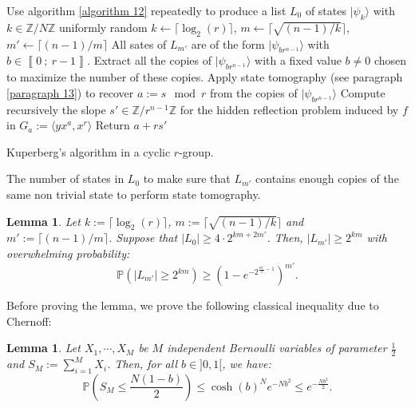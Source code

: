 \documentclass[a4paper,10pt]{report}
\theoremstyle{definition}
\theoremstyle{plain}
\newtheorem{Lemma}[Definition]{Lemma}
\theoremstyle{definition}
\newcommand{\Z}{\mathbb{Z}}
\renewcommand{\i}[2]{\left\llbracket #1~;~#2\right\rrbracket}
\renewcommand{\(}{\left(}
\renewcommand{\)}{\right)}
\renewcommand{\P}{\mathbb{P}}
\begin{document}
\begin{algorithm}\label{algorithm 14}
\SetAlgoLined
{}
\KwResult{$s\in\Z/N\Z$.}

Use algorithm \ref{algorithm 12} repeatedly to produce a list $L_0$ of states $|\psi_k\rangle$ with $k\in\Z/N\Z$ uniformly random\;
$k\leftarrow \lceil\log_2(r)\rceil$, $m\leftarrow \lceil \sqrt{(n-1)/k}\rceil$, $m'\leftarrow\lceil (n-1)/m\rceil$\;
All sates of $L_{m'}$ are of the form $|\psi_{br^{n-1}}\rangle$ with $b\in\i{0}{r-1}$. Extract all the copies of $|\psi_{br^{n-1}}\rangle$ with a fixed value $b\neq 0$ chosen to maximize the number of these copies. \;
Apply state tomography (see paragraph \ref{paragraph 13}) to recover $a:=s \mod r$ from the copies of $|\psi_{br^{n-1}}\rangle$\;
Compute recursively the slope $s'\in\Z/r^{n-1}\Z$ for the hidden reflection problem induced by $f$ in $G_a:=\langle yx^a,x^r\rangle$\;
Return $a+rs'$\;

\caption{Kuperberg's algorithm in a cyclic $r$-group.}
\end{algorithm}

The number of states in $L_0$ to make sure that $L_{m'}$ contains enough copies of the same non trivial state to perform state tomography.

\begin{Lemma}\label{Lemma 21}
Let $k:=\lceil\log_2(r)\rceil$, $m:=\lceil \sqrt{(n-1)/k}\rceil$ and $m':=\lceil (n-1)/m\rceil$. Suppose that $|L_0|\geq 4\cdot 2^{km+2m'}$. Then, $|L_{m'}|\geq 2^{km}$ with overwhelming probability: 
\[\P\(|L_{m'}|\geq 2^{km}\)\geq \(1-e^{-2^{\frac{m'}{3}-1}}\)^{m'}.\]
\end{Lemma}

Before proving the lemma, we prove the following classical inequality due to Chernoff:

\begin{Lemma}
Let $X_1, \cdots, X_{M}$ be $M$ independent Bernoulli variables of parameter $\frac{1}{2}$ and $S_M:=\sum_{i=1}^M X_i$. Then, for all $b\in]0,1[$, we have:
\[\P\(S_M\leq\frac{N(1-b)}{2}\)\leq \cosh(b)^N e^{-Nb^2}\leq e^{-\frac{Nb^2}{2}}.\]
\end{Lemma}
\end{document}
